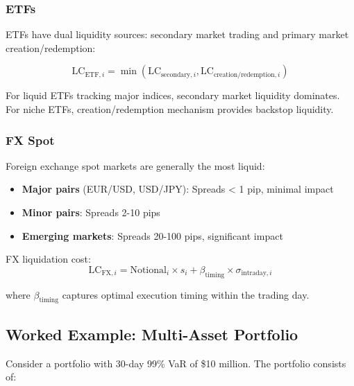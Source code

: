 \documentclass[11pt,a4paper]{article}
\begin{document}
\subsubsection{ETFs}

ETFs have dual liquidity sources: secondary market trading and primary market creation/redemption:

\begin{equation}
\text{LC}_{\text{ETF},i} = \min\left(\text{LC}_{\text{secondary},i}, \text{LC}_{\text{creation/redemption},i}\right)
\end{equation}

For liquid ETFs tracking major indices, secondary market liquidity dominates. For niche ETFs, creation/redemption mechanism provides backstop liquidity.

\subsubsection{FX Spot}

Foreign exchange spot markets are generally the most liquid:

\begin{itemize}
    \item \textbf{Major pairs} (EUR/USD, USD/JPY): Spreads < 1 pip, minimal impact
    \item \textbf{Minor pairs}: Spreads 2-10 pips
    \item \textbf{Emerging markets}: Spreads 20-100 pips, significant impact
\end{itemize}

FX liquidation cost:
\begin{equation}
\text{LC}_{\text{FX},i} = \text{Notional}_i \times s_i + \beta_{\text{timing}} \times \sigma_{\text{intraday},i}
\end{equation}

where $\beta_{\text{timing}}$ captures optimal execution timing within the trading day.

\subsection{Worked Example: Multi-Asset Portfolio}

Consider a portfolio with 30-day 99\% VaR of \$10 million. The portfolio consists of:
\end{document}

